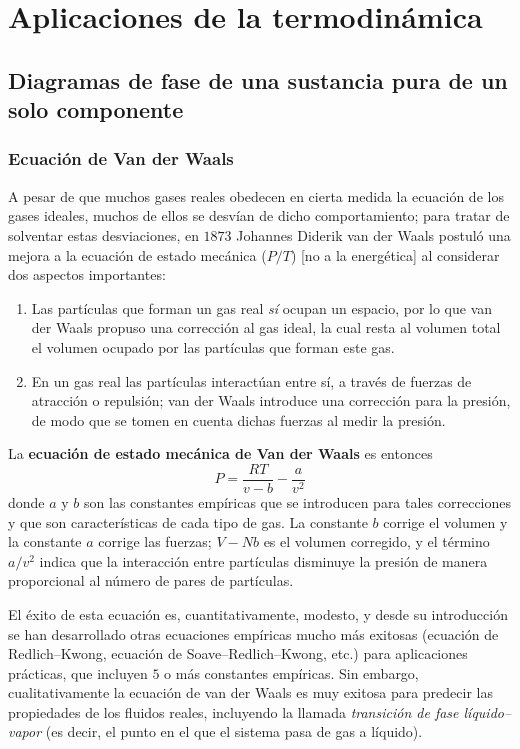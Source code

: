 \chapter{Aplicaciones de la termodinámica}

\section{Diagramas de fase de una sustancia pura de un solo componente}

\subsection{Ecuación de Van der Waals}

A pesar de que muchos gases reales obedecen en cierta medida la ecuación de los gases ideales,
muchos de ellos se desvían de dicho comportamiento; para tratar de solventar estas desviaciones, en
$1873$ Johannes Diderik van der Waals postuló una mejora a la ecuación de estado mecánica
($P/T$) [no a la energética] al considerar dos aspectos importantes:
\begin{enumerate}[label=\arabic*.,itemsep=2pt]
  \item Las partículas que forman un gas real \emph{sí} ocupan un espacio, por lo que van der Waals
    propuso una corrección al gas ideal, la cual resta al volumen total el volumen ocupado por las
    partículas que forman este gas.
  \item En un gas real las partículas interactúan entre sí, a través de fuerzas de atracción o
    repulsión; van der Waals introduce una corrección para la presión, de modo que se tomen en
    cuenta dichas fuerzas al medir la presión.
\end{enumerate}
La \textbf{ecuación de estado mecánica de Van der Waals} es entonces
\begin{equation*}
  \boxed{P=\frac{RT}{v-b}-\frac{a}{v^{2}}}
\end{equation*}
donde $a$ y $b$ son las constantes empíricas que se introducen para tales correcciones y que son
características de cada tipo de gas. La constante $b$ corrige el volumen y la constante $a$ corrige
las fuerzas; $V-Nb$ es el volumen corregido, y el término $a/v^{2}$ indica que la interacción entre
partículas disminuye la presión de manera proporcional al número de pares de partículas.

El éxito de esta ecuación es, cuantitativamente, modesto, y desde su introducción se han
desarrollado otras ecuaciones empíricas mucho más exitosas (ecuación de Redlich--Kwong, ecuación de
Soave--Redlich--Kwong, etc.) para aplicaciones prácticas, que incluyen $5$ o más constantes
empíricas. Sin embargo, cualitativamente la ecuación de van der Waals es muy exitosa para predecir
las propiedades de los fluidos reales, incluyendo la llamada \emph{transición de fase
líquido--vapor} (es decir, el punto en el que el sistema pasa de gas a líquido).

